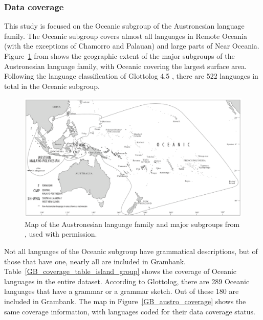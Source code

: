 \documentclass[12pt,letterpaper]{article}
\begin{document}
\FloatBarrier
\subsubsection{Data coverage} 
This study is focused on the Oceanic subgroup of the Austronesian language family. The Oceanic subgroup covers almost all languages in Remote Oceania (with the exceptions of Chamorro and Palauan) and large parts of Near Oceania. Figure~\ref{Oceanic_map} from \citet[2]{protooceanicvol5} shows the geographic extent of the major subgroups of the Austronesian language family, with Oceanic covering the largest surface area. Following the language classification of Glottolog 4.5 \citep{glottolog4_5}, there are 522 languages in total in the Oceanic subgroup.

\begin{figure}[ht]
\centering
\includegraphics[width=15cm]{illustrations/ross_pawley_osmond_protooceanic_vol5.png}
\caption{Map of the Austronesian language family and major subgroups from \citet[2]{protooceanicvol5}, used with permission.}
\label{Oceanic_map}
\end{figure} 

Not all languages of the Oceanic subgroup have grammatical descriptions, but of those that have one, nearly all are included in Grambank. Table~\ref{GB_coverage_table_island_group} shows the coverage of Oceanic languages in the entire dataset. According to Glottolog, there are 289 Oceanic languages that have a grammar or a grammar sketch. Out of these 180 are included in Grambank. The map in Figure~\ref{GB_austro_coverage} shows the same coverage information, with languages coded for their data coverage status.


\end{document}
